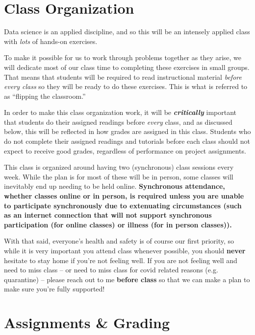 \documentclass[12pt]{article}
\begin{document}
\section{Class Organization}

Data science is an applied discipline, and so this will be an intensely applied class with \emph{lots} of hands-on exercises.

To make it possible for us to work through problems together as they arise, we will dedicate most of our class time to completing these exercises in small groups. That means that students will be required to read instructional material \emph{before every class} so they will be ready to do these exercises. This is what is referred to as ``flipping the classroom.''

In order to make this class organization work, it will be \textbf{\emph{critically}} important that students do their assigned readings before \emph{every} class, and as discussed below, this will be reflected in how grades are assigned in this class. Students who do not complete their assigned readings and tutorials before each class should not expect to receive good grades, regardless of performance on project assignments.

This class is organized around having two (synchronous) class sessions every week. While the plan is for most of these will be in person, some classes will inevitably end up needing to be held online. \textbf{Synchronous attendance, whether classes online or in person, is required unless you are unable to participate synchronously due to extenuating circumstances (such as an internet connection that will not support synchronous participation (for online classes) or illness (for in person classes)).} 

With that said, everyone's health and safety is of course our first priority, so while it is very important you attend class whenever possible, you should \textbf{never} hesitate to stay home if you're not feeling well. If you are not feeling well and need to miss class -- or need to miss class for covid related reasons (e.g. quarantine) -- please reach out to me \textbf{before class} so that we can make a plan to make sure you're fully supported!


\section{Assignments \& Grading}
\end{document}
